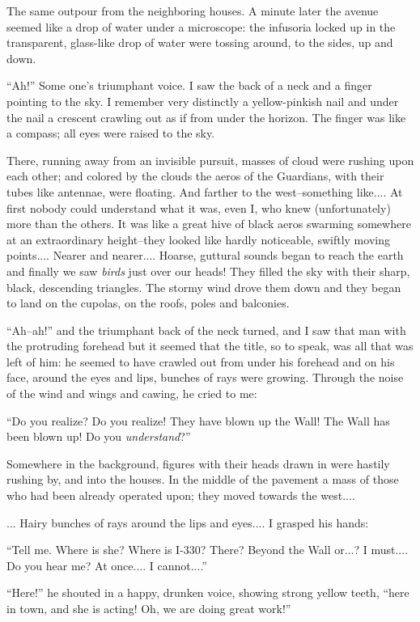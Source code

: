 \documentclass[11pt,openany]{book}
\begin{document}
The same outpour from the neighboring houses. A minute later the avenue seemed like a drop of water under a microscope: the infusoria locked up in the transparent, glass-like drop of water were tossing around, to the sides, up and down.

``Ah!'' Some one's triumphant voice. I saw the back of a neck and a finger pointing to the sky. I remember very distinctly a yellow-pinkish nail and under the nail a crescent crawling out as if from under the horizon. The finger was like a compass; all eyes were raised to the sky.

There, running away from an invisible pursuit, masses of cloud were rushing upon each other; and colored by the clouds the aeros of the Guardians, with their tubes like antennae, were floating. And farther to the west--something like.... At first nobody could understand what it was, even I, who knew (unfortunately) more than the others. It was like a great hive of black aeros swarming somewhere at an extraordinary height--they looked like hardly noticeable, swiftly moving points.... Nearer and nearer.... Hoarse, guttural sounds began to reach the earth and finally we saw \emph{birds} just over our heads! They filled the sky with their sharp, black, descending triangles. The stormy wind drove them down and they began to land on the cupolas, on the roofs, poles and balconies.

``Ah--ah!'' and the triumphant back of the neck turned, and I saw that man with the protruding forehead but it seemed that the title, so to speak, was all that was left of him: he seemed to have crawled out from under his forehead and on his face, around the eyes and lips, bunches of rays were growing. Through the noise of the wind and wings and cawing, he cried to me:

``Do you realize? Do you realize! They have blown up the Wall! The Wall has been blown up! Do you \emph{understand}?''

Somewhere in the background, figures with their heads drawn in were hastily rushing by, and into the houses. In the middle of the pavement a mass of those who had been already operated upon; they moved towards the west....

... Hairy bunches of rays around the lips and eyes.... I grasped his hands:

``Tell me. Where is she? Where is I-330? There? Beyond the Wall or...? I must.... Do you hear me? At once.... I cannot....''

``Here!'' he shouted in a happy, drunken voice, showing strong yellow teeth, ``here in town, and she is acting! Oh, we are doing great work!''
\end{document}
